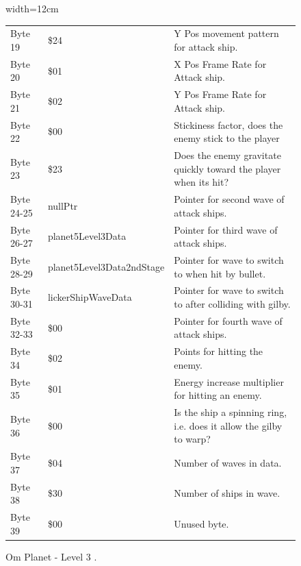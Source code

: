 \begin{figure}[H]
{\begin{adjustbox}{width=12cm}
\begin{tabular}{lll}
 Byte 19    & \$24                       & Y Pos movement pattern for attack ship.                             \\
 Byte 20    & \$01                       & X Pos Frame Rate for Attack ship.                                   \\
 Byte 21    & \$02                       & Y Pos Frame Rate for Attack ship.                                   \\
 Byte 22    & \$00                       & Stickiness factor, does the enemy stick to the player               \\
 Byte 23    & \$23                       & Does the enemy gravitate quickly toward the player when its hit?    \\
 Byte 24-25 & nullPtr                   & Pointer for second wave of attack ships.                            \\
 Byte 26-27 & planet5Level3Data         & Pointer for third wave of attack ships.                             \\
 Byte 28-29 & planet5Level3Data2ndStage & Pointer for wave to switch to when hit by bullet.                   \\
 Byte 30-31 & lickerShipWaveData        & Pointer for  wave to switch to after colliding with gilby.          \\
 Byte 32-33 & \$00                       & Pointer for fourth wave of attack ships.                            \\
 Byte 34    & \$02                       & Points for hitting the enemy.                                       \\
 Byte 35    & \$01                       & Energy increase multiplier for hitting an enemy.                    \\
 Byte 36    & \$00                       & Is the ship a spinning ring, i.e. does it allow the gilby to warp?  \\
 Byte 37    & \$04                       & Number of waves in data.                                            \\
 Byte 38    & \$30                       & Number of ships in wave.                                            \\
 Byte 39    & \$00                       & Unused byte.                                                        \\
\bottomrule
\end{tabular}

  \end{adjustbox}

  }\caption*{Om Planet - Level 3
.}
\end{figure}

